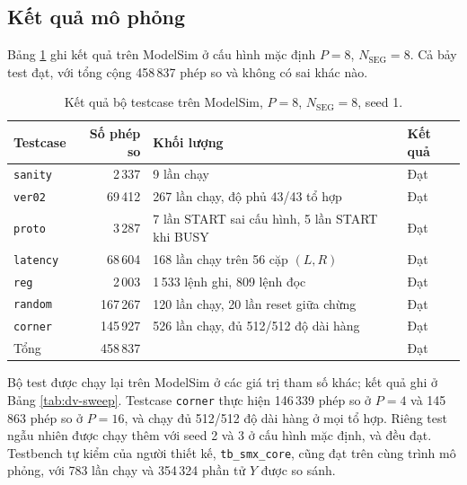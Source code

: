 \subsection{Kết quả mô phỏng}

Bảng \ref{tab:dv-results} ghi kết quả trên ModelSim ở cấu hình mặc định $P = 8$, $N_{\text{SEG}} = 8$. Cả bảy test đạt, với tổng cộng 458\,837 phép so và không có sai khác nào.

\begin{table}[htbp]
\centering
\small
\begin{tabular}{lrp{7.4cm}l}
\toprule
Testcase & Số phép so & Khối lượng & Kết quả \\
\midrule
\texttt{sanity}  &   2\,337 & 9 lần chạy & Đạt \\
\texttt{ver02}   &  69\,412 & 267 lần chạy, độ phủ 43/43 tổ hợp & Đạt \\
\texttt{proto}   &   3\,287 & 7 lần START sai cấu hình, 5 lần START khi BUSY & Đạt \\
\texttt{latency} &  68\,604 & 168 lần chạy trên 56 cặp $(L, R)$ & Đạt \\
\texttt{reg}     &   2\,003 & 1\,533 lệnh ghi, 809 lệnh đọc & Đạt \\
\texttt{random}  & 167\,267 & 120 lần chạy, 20 lần reset giữa chừng & Đạt \\
\texttt{corner}  & 145\,927 & 526 lần chạy, đủ 512/512 độ dài hàng & Đạt \\
\midrule
Tổng             & 458\,837 & & Đạt \\
\bottomrule
\end{tabular}
\caption{Kết quả bộ testcase trên ModelSim, $P = 8$, $N_{\text{SEG}} = 8$, seed 1.}
\label{tab:dv-results}
\end{table}

Bộ test được chạy lại trên ModelSim ở các giá trị tham số khác; kết quả ghi ở Bảng \ref{tab:dv-sweep}. Testcase \texttt{corner} thực hiện 146\,339 phép so ở $P = 4$ và 145\,863 phép so ở $P = 16$, và chạy đủ 512/512 độ dài hàng ở mọi tổ hợp. Riêng test ngẫu nhiên được chạy thêm với seed 2 và 3 ở cấu hình mặc định, và đều đạt. Testbench tự kiểm của người thiết kế, \texttt{tb\_smx\_core}, cũng đạt trên cùng trình mô phỏng, với 783 lần chạy và 354\,324 phần tử $Y$ được so sánh.

